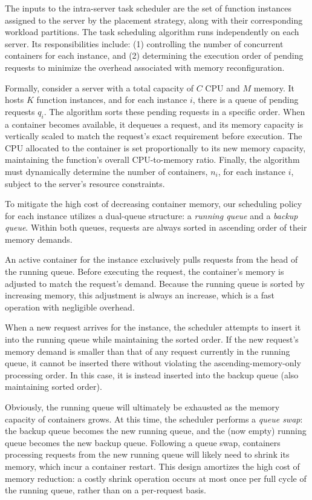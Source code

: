 The inputs to the intra-server task scheduler are the set of function instances assigned to the server by the placement strategy, along with their corresponding workload partitions.
The task scheduling algorithm runs independently on each server.
Its responsibilities include: (1) controlling the number of concurrent containers for each instance, and (2) determining the execution order of pending requests to minimize the overhead associated with memory reconfiguration.

Formally, consider a server with a total capacity of $C$ CPU and $M$ memory. It hosts $K$ function instances, and for each instance $i$, there is a queue of pending requests $q_i$.
The algorithm sorts these pending requests in a specific order.
When a container becomes available, it dequeues a request, and its memory capacity is vertically scaled to match the request's exact requirement before execution.
The CPU allocated to the container is set proportionally to its new memory capacity, maintaining the function's overall CPU-to-memory ratio.
Finally, the algorithm must dynamically determine the number of containers, $n_i$, for each instance $i$, subject to the server's resource constraints.



To mitigate the high cost of decreasing container memory, our scheduling policy for each instance utilizes a dual-queue structure: a \emph{running queue} and a \emph{backup queue}. Within both queues, requests are always sorted in ascending order of their memory demands.

An active container for the instance exclusively pulls requests from the head of the running queue. Before executing the request, the container's memory is adjusted to match the request's demand. Because the running queue is sorted by increasing memory, this adjustment is always an increase, which is a fast operation with negligible overhead.

When a new request arrives for the instance, the scheduler attempts to insert it into the running queue while maintaining the sorted order. If the new request's memory demand is smaller than that of any request currently in the running queue, it cannot be inserted there without violating the ascending-memory-only processing order. In this case, it is instead inserted into the backup queue (also maintaining sorted order).

Obviously, the running queue will ultimately be exhausted as the memory capacity of containers grows.
At this time, the scheduler performs a \emph{queue swap}: the backup queue becomes the new running queue, and the (now empty) running queue becomes the new backup queue.
Following a queue swap, containers processing requests from the new running queue will likely need to shrink its memory, which incur a container restart.
This design amortizes the high cost of memory reduction: a costly shrink operation occurs at most once per full cycle of the running queue, rather than on a per-request basis.


